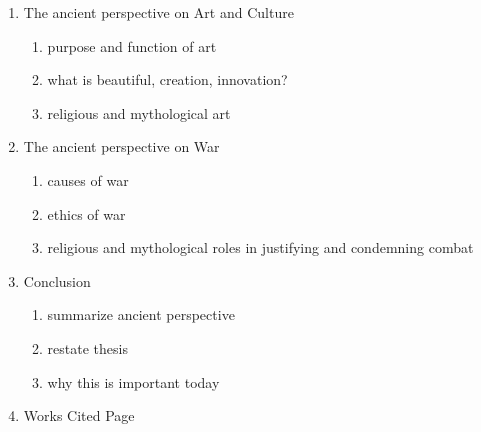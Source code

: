 \documentclass[12pt,a4paper,english]{article}
\begin{document}
\begin{enumerate}
    \item The ancient perspective on Art and Culture
      \begin{enumerate}
        \item purpose and function of art
        \item what is beautiful, creation, innovation?
        \item religious and mythological art
      \end{enumerate}
    \item The ancient perspective on War
      \begin{enumerate}
        \item causes of war
        \item ethics of war
        \item religious and mythological roles in justifying and condemning combat
      \end{enumerate}
    \item Conclusion
    \begin{enumerate}
      \item summarize ancient perspective
      \item restate thesis
      \item why this is important today
    \end{enumerate}
  \item Works Cited Page
\end{enumerate}
\fussy
\end{document}
